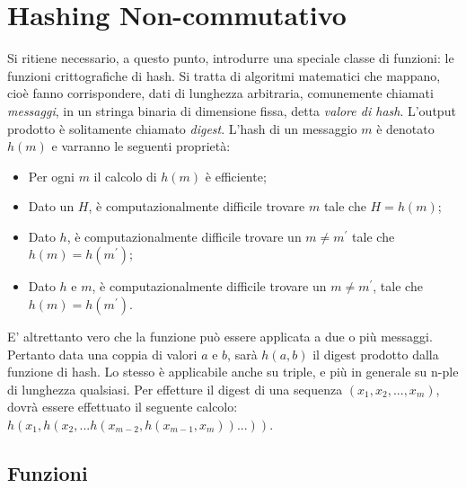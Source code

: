 	
\section{Hashing Non-commutativo}
	

	Si ritiene necessario, a questo punto, introdurre una speciale classe di funzioni: le funzioni crittografiche di hash. Si tratta di algoritmi matematici che mappano, cioè fanno corrispondere, dati di lunghezza arbitraria, comunemente chiamati \textit{messaggi}, in un stringa binaria di dimensione fissa, detta \textit{valore di hash}. L'output prodotto è solitamente chiamato \textit{digest}. 
	L'hash di un messaggio $ m $ è denotato $ h(m) $ e varranno le seguenti proprietà: \cite{slide_pizzo}
	
	\begin{itemize}
		\item Per ogni $ m $ il calcolo di $ h(m) $ è efficiente;
		\item Dato un $ H $, è computazionalmente difficile trovare $ m $ tale che $ H = h(m) $;
		\item Dato $ h $, è computazionalmente difficile trovare un $ m \ne m^{'}$ tale che $ h(m) = h(m^{'}) $;
		\item Dato $ h $ e $ m $, è computazionalmente difficile trovare un $ m \ne m^{'} $, tale che $ h(m) = h(m^{'}) $.
	\end{itemize}

	E' altrettanto vero che la funzione può essere applicata a due o più messaggi. Pertanto data una coppia di valori $ a $ e $ b $, sarà $ h(a,b) $ il digest prodotto dalla funzione di hash. Lo stesso è applicabile anche su triple, e più in generale su n-ple di lunghezza qualsiasi. Per effetture il digest di una sequenza $ (x_{1}, x_{2}, ... , x_{m}) $, dovrà essere effettuato il seguente calcolo: $ h(x_{1}, h(x_{2}, ... h(x_{m-2},h(x_{m-1},x_{m}))...)) $. \cite{authskiplist}
	
		\subsection{Funzioni}
	
			
